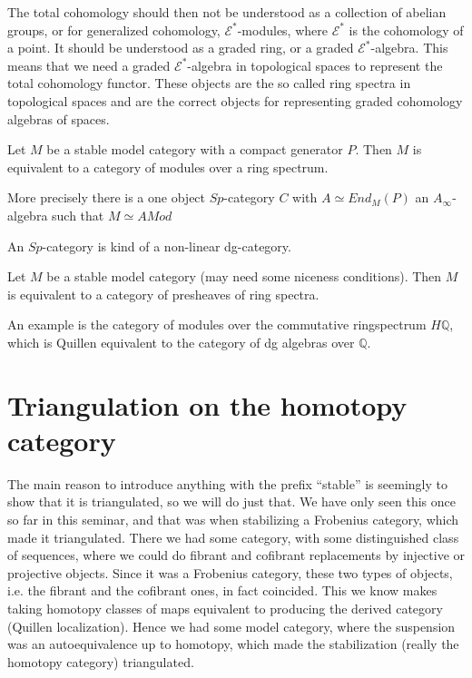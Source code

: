 The total cohomology should then not be understood as a collection of abelian groups, 
or for generalized cohomology, 
$\mathcal{E}^* $-modules, 
where $\mathcal{E}^*$ is the cohomology of a point. 
It should be understood as a graded ring, 
or a graded $\mathcal{E}^* $-algebra. 
This means that we need a graded $\mathcal{E}^*$-algebra in topological spaces to represent the total cohomology functor. 
These objects are the so called ring spectra in topological spaces and are the correct objects for representing graded cohomology algebras of spaces. 

\begin{theorem}

Let $M$ be a stable model category with a compact generator $P$. 
Then $M$ is equivalent to a category of modules over a ring spectrum.

More precisely there is a one object $Sp$-category $C$ with $A\simeq End_M(P)$ an $A_{\infty}$-algebra such that $M\simeq AMod$
\end{theorem}

An $Sp$-category is kind of a non-linear dg-category.


\begin{theorem}

Let $M$ be a stable model category (may need some niceness conditions). 
Then $M$ is equivalent to a category of presheaves of ring spectra. 
\end{theorem}

An example is the category of modules over the commutative ringspectrum $H\mathbb{Q}$, 
which is Quillen equivalent to the category of dg algebras over $\mathbb{Q}$. 


\section{Triangulation on the homotopy category}

The main reason to introduce anything with the prefix ``stable'' is seemingly to show that it is triangulated, 
so we will do just that. 
We have only seen this once so far in this seminar, 
and that was when stabilizing a Frobenius category, 
which made it triangulated. 
There we had some category, 
with some distinguished class of sequences, 
where we could do fibrant and cofibrant replacements by injective or projective objects. 
Since it was a Frobenius category, 
these two types of objects, 
i.e. the fibrant and the cofibrant ones, 
in fact coincided. 
This we know makes taking homotopy classes of maps equivalent to producing the derived category (Quillen localization). 
Hence we had some model category, 
where the suspension was an autoequivalence up to homotopy, 
which made the stabilization (really the homotopy category) triangulated. 

